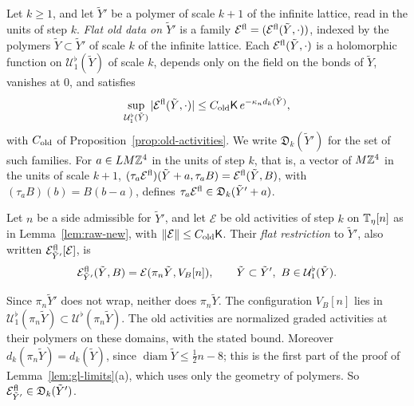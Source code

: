 \begin{definition}\label{def:gl-flat-data}
Let $k\ge1$, and let $\tilde Y'$ be a polymer of scale $k+1$ of the infinite lattice, read in the units of step $k$. \emph{Flat old data on $\tilde Y'$} is a family $\mathcal E^{\rm fl}=(\mathcal E^{\rm fl}(\tilde Y,\cdot))$, indexed by the polymers $\tilde Y\subset\tilde Y'$ of scale $k$ of the infinite lattice. Each $\mathcal E^{\rm fl}(\tilde Y,\cdot)$ is a holomorphic function on $\mathcal U^\flat_1(\tilde Y)$ of scale $k$, depends only on the field on the bonds of $\tilde Y$, vanishes at $0$, and satisfies
\[
\sup_{\mathcal U^\flat_1(\tilde Y)}|\mathcal E^{\rm fl}(\tilde Y,\cdot)|\le C_{\rm old}\mathsf K\,e^{-\kappa_nd_k(\tilde Y)},
\]
with $C_{\rm old}$ of Proposition~\ref{prop:old-activities}. We write $\mathfrak D_k(\tilde Y')$ for the set of such families. For $a\in LM\mathbb Z^4$ in the units of step $k$, that is, a vector of $M\mathbb Z^4$ in the units of scale $k+1$, $(\tau_a\mathcal E^{\rm fl})(\tilde Y+a,\tau_aB)=\mathcal E^{\rm fl}(\tilde Y,B)$, with $(\tau_aB)(b)=B(b-a)$, defines $\tau_a\mathcal E^{\rm fl}\in\mathfrak D_k(\tilde Y'+a)$.

Let $n$ be a side admissible for $\tilde Y'$, and let $\mathcal E$ be old activities of step $k$ on $\mathbb T_\eta[n]$ as in Lemma~\ref{lem:raw-new}, with $\|\mathcal E\|\le C_{\rm old}\mathsf K$. Their \emph{flat restriction} to $\tilde Y'$, also written $\mathcal E^{\rm fl}_{\tilde Y'}[\mathcal E]$, is
\[
\mathcal E^{\rm fl}_{\tilde Y'}(\tilde Y,B)=\mathcal E(\pi_n\tilde Y,V_B[n]),\qquad\tilde Y\subset\tilde Y',\ B\in\mathcal U^\flat_1(\tilde Y).
\]
\end{definition}

Since $\pi_n\tilde Y'$ does not wrap, neither does $\pi_n\tilde Y$. The configuration $V_B[n]$ lies in $\mathcal U^\flat_1(\pi_n\tilde Y)\subset\mathcal U^\flat(\pi_n\tilde Y)$. The old activities are normalized graded activities at their polymers on these domains, with the stated bound. Moreover $d_k(\pi_n\tilde Y)=d_k(\tilde Y)$, since $\operatorname{diam}\tilde Y\le\frac12n-8$; this is the first part of the proof of Lemma~\ref{lem:gl-limits}(a), which uses only the geometry of polymers. So $\mathcal E^{\rm fl}_{\tilde Y'}\in\mathfrak D_k(\tilde Y')$.

